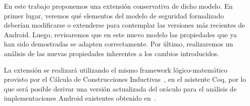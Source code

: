 En este trabajo proponemos una extensión conservativa de dicho modelo. En primer
lugar, veremos qué elementos del modelo de seguridad formalizado deberían
modificarse o extenderse para contemplar las versiones más recientes de Android.
Luego, revisaremos que en este nuevo modelo las propiedades que ya han sido
demostradas se adapten correctamente. Por último, realizaremos un análisis de
las nuevas propiedades inherentes a los cambios introducidos.

La extensión se realizará utilizando el mismo framework lógico-matemático
provisto por el Cálculo de Construcciones Inductivas~\cite{coqart, coquand:88},
en el asistente Coq, por lo que será posible derivar una versión actualizada del
oráculo para el análisis de implementaciones Android existentes obtenido en~\cite{fgorostiaga}.